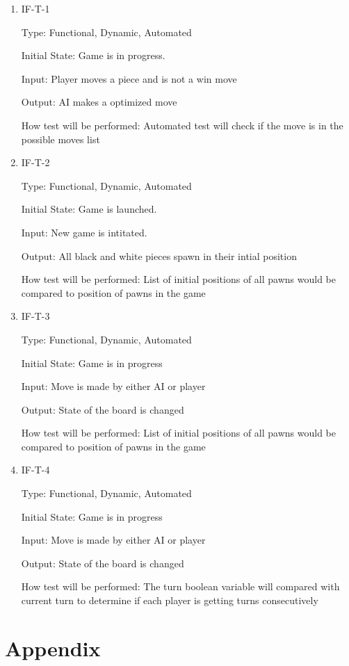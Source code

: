 \documentclass[12pt, titlepage]{article}
\begin{document}
\begin{enumerate}
    \item{IF-T-1}

    Type: Functional, Dynamic, Automated

    Initial State: Game is in progress.

    Input: Player moves a piece and is not a win move
	
    Output: AI makes a optimized move
	
    How test will be performed: Automated test will check if the move is in the possible moves list
    
    \item{IF-T-2}

    Type: Functional, Dynamic, Automated

    Initial State: Game is launched.

    Input: New game is intitated.
	
    Output: All black and white pieces spawn in their intial position
	
    How test will be performed: List of initial positions of all pawns would be compared to position of pawns in the game
    
    \item{IF-T-3}

    Type: Functional, Dynamic, Automated

    Initial State: Game is in progress

    Input: Move is made by either AI or player
	
    Output: State of the board is changed
	
    How test will be performed: List of initial positions of all pawns would be compared to position of pawns in the game
    
    \item{IF-T-4}

    Type: Functional, Dynamic, Automated

    Initial State: Game is in progress

    Input: Move is made by either AI or player
	
    Output: State of the board is changed
	
    How test will be performed: The turn boolean variable will compared with current turn to determine if each player is getting turns consecutively
    
\end{enumerate}

\section{Appendix}
\end{document}
